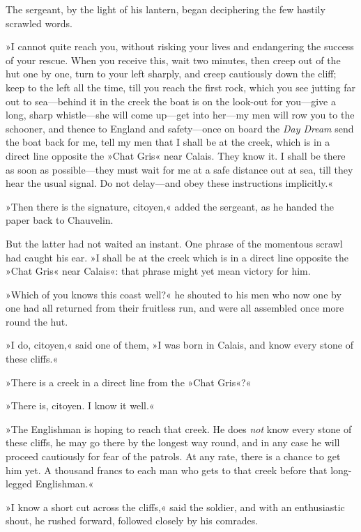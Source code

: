 The sergeant, by the light of his lantern, began deciphering the few hastily scrawled words.

»I cannot quite reach you, without risking your lives and endangering the success of your rescue. When you receive this, wait two minutes, then creep out of the hut one by one, turn to your left sharply, and creep cautiously down the cliff; keep to the left all the time, till you reach the first rock, which you see jutting far out to sea\allowbreak---\allowbreak behind it in the creek the boat is on the look-out for you\allowbreak---\allowbreak give a long, sharp whistle\allowbreak---\allowbreak she will come up\allowbreak---\allowbreak get into her\allowbreak---\allowbreak my men will row you to the schooner, and thence to England and safety\allowbreak---\allowbreak once on board the \textit{Day Dream} send the boat back for me, tell my men that I shall be at the creek, which is in a direct line opposite the »Chat Gris« near Calais. They know it. I shall be there as soon as possible\allowbreak---\allowbreak they must wait for me at a safe distance out at sea, till they hear the usual signal. Do not delay\allowbreak---\allowbreak and obey these instructions implicitly.«

»Then there is the signature, citoyen,« added the sergeant, as he handed the paper back to Chauvelin.

But the latter had not waited an instant. One phrase of the momentous scrawl had caught his ear. »I shall be at the creek which is in a direct line opposite the »Chat Gris« near Calais«: that phrase might yet mean victory for him.

»Which of you knows this coast well?« he shouted to his men who now one by one had all returned from their fruitless run, and were all assembled once more round the hut.

»I do, citoyen,« said one of them, »I was born in Calais, and know every stone of these cliffs.«

»There is a creek in a direct line from the »Chat Gris«?«

»There is, citoyen. I know it well.«

»The Englishman is hoping to reach that creek. He does \textit{not} know every stone of these cliffs, he may go there by the longest way round, and in any case he will proceed cautiously for fear of the patrols. At any rate, there is a chance to get him yet. A thousand francs to each man who gets to that creek before that long-legged Englishman.«

»I know a short cut across the cliffs,« said the soldier, and with an enthusiastic shout, he rushed forward, followed closely by his comrades.

